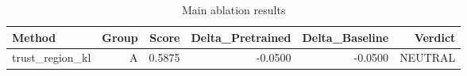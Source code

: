 \begin{table}[htbp]
\centering
\caption{Main ablation results}
\label{tab:main-results}
\begin{tabular}{lrrrrr}
\toprule
\textbf{Method} & \textbf{Group} & \textbf{Score} & \textbf{Delta\_Pretrained} & \textbf{Delta\_Baseline} & \textbf{Verdict} \\
\midrule
trust\_region\_kl & A & 0.5875 & -0.0500 & -0.0500 & NEUTRAL \\
\bottomrule
\end{tabular}
\end{table}
